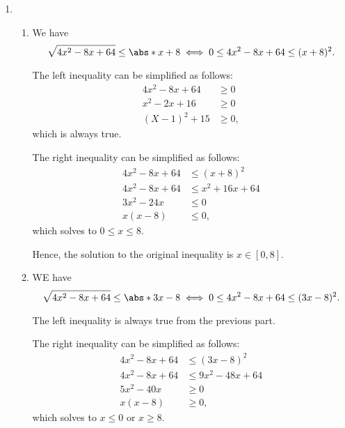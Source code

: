 \Question{\currfilebase}

\begin{enumerate}
    \item \begin{enumerate}
              \item We have
                    \[
                        \sqrt{4x^2 - 8x + 64} \leq \abs*{x + 8} \iff 0 \leq 4x^2 - 8x + 64 \leq (x + 8)^2.
                    \]

                    The left inequality can be simplified as follows:
                    \begin{align*}
                        4x^2 - 8x + 64 & \geq 0  \\
                        x^2 - 2x + 16  & \geq 0  \\
                        (X - 1)^2 + 15 & \geq 0,
                    \end{align*}
                    which is always true.

                    The right inequality can be simplified as follows:
                    \begin{align*}
                        4x^2 - 8x + 64 & \leq (x + 8)^2      \\
                        4x^2 - 8x + 64 & \leq x^2 + 16x + 64 \\
                        3x^2 - 24 x    & \leq 0              \\
                        x (x - 8)      & \leq 0,
                    \end{align*}
                    which solves to \(0 \leq x \leq 8\).

                    Hence, the solution to the original inequality is \(x \in [0, 8]\).

              \item WE have
                    \[
                        \sqrt{4x^2 - 8x + 64} \leq \abs*{3x - 8} \iff 0 \leq 4x^2 - 8x + 64 \leq (3x - 8)^2.
                    \]

                    The left inequality is always true from the previous part.

                    The right inequality can be simplified as follows:
                    \begin{align*}
                        4x^2 - 8x + 64 & \leq (3x - 8)^2      \\
                        4x^2 - 8x + 64 & \leq 9x^2 - 48x + 64 \\
                        5x^2 - 40x     & \geq 0               \\
                        x (x - 8)      & \geq 0,
                    \end{align*}
                    which solves to \(x \leq 0\) or \(x \geq 8\).


\end{enumerate}
\end{enumerate}
